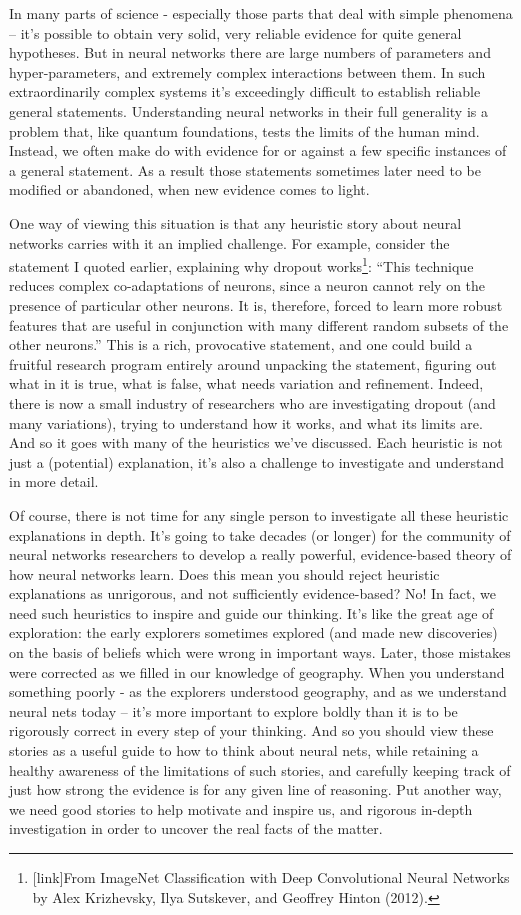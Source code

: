 \documentclass[a4paper,twoside,10pt]{book}
\begin{document}
In many parts of science - especially those parts that deal with simple phenomena -- it's possible to obtain very solid, very reliable evidence for quite general hypotheses. But in neural networks there are large numbers of parameters and hyper-parameters, and extremely complex interactions between them. In such extraordinarily complex systems it's exceedingly difficult to establish reliable general statements. Understanding neural networks in their full generality is a problem that, like quantum foundations, tests the limits of the human mind. Instead, we often make do with evidence for or against a few specific instances of a general statement. As a result those statements sometimes later need to be modified or abandoned, when new evidence comes to light.

One way of viewing this situation is that any heuristic story about neural networks carries with it an implied challenge. For example, consider the statement I quoted earlier, explaining why dropout works\footnote{[link]From ImageNet Classification with Deep Convolutional Neural Networks by Alex Krizhevsky, Ilya Sutskever, and Geoffrey Hinton (2012).}: ``This technique reduces complex co-adaptations of neurons, since a neuron cannot rely on the presence of particular other neurons. It is, therefore, forced to learn more robust features that are useful in conjunction with many different random subsets of the other neurons.'' This is a rich, provocative statement, and one could build a fruitful research program entirely around unpacking the statement, figuring out what in it is true, what is false, what needs variation and refinement. Indeed, there is now a small industry of researchers who are investigating dropout (and many variations), trying to understand how it works, and what its limits are. And so it goes with many of the heuristics we've discussed. Each heuristic is not just a (potential) explanation, it's also a challenge to investigate and understand in more detail.

Of course, there is not time for any single person to investigate all these heuristic explanations in depth. It's going to take decades (or longer) for the community of neural networks researchers to develop a really powerful, evidence-based theory of how neural networks learn. Does this mean you should reject heuristic explanations as unrigorous, and not sufficiently evidence-based? No! In fact, we need such heuristics to inspire and guide our thinking. It's like the great age of exploration: the early explorers sometimes explored (and made new discoveries) on the basis of beliefs which were wrong in important ways. Later, those mistakes were corrected as we filled in our knowledge of geography. When you understand something poorly - as the explorers understood geography, and as we understand neural nets today -- it's more important to explore boldly than it is to be rigorously correct in every step of your thinking. And so you should view these stories as a useful guide to how to think about neural nets, while retaining a healthy awareness of the limitations of such stories, and carefully keeping track of just how strong the evidence is for any given line of reasoning. Put another way, we need good stories to help motivate and inspire us, and rigorous in-depth investigation in order to uncover the real facts of the matter.
\end{document}
